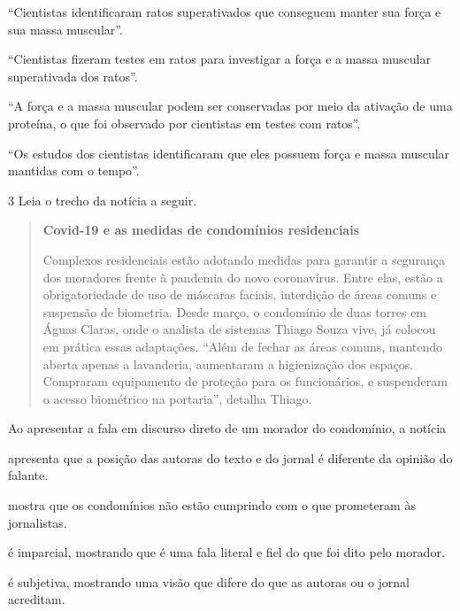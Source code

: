 \begin{escolha}
\item ``Cientistas identificaram ratos superativados que conseguem manter
sua força e sua massa muscular''.

\item ``Cientistas fizeram testes em ratos para investigar a força e a
massa muscular superativada dos ratos''.

\item ``A força e a massa muscular podem ser conservadas por meio da
ativação de uma proteína, o que foi observado por cientistas em testes
com ratos''.

\item ``Os estudos dos cientistas identificaram que eles possuem força e
massa muscular mantidas com o tempo''.
\end{escolha}

\num{3} Leia o trecho da notícia a seguir.

\begin{quote}
\textbf{Covid-19 e as medidas de condomínios residenciais}


Complexos residenciais estão adotando medidas para garantir a segurança
dos moradores frente à pandemia do novo coronavírus. Entre elas, estão a
obrigatoriedade de uso de máscaras faciais, interdição de áreas comuns e
suspensão de biometria. Desde março, o condomínio de duas torres em
Águas Claras, onde o analista de sistemas Thiago Souza vive, já colocou
em prática essas adaptações. ``Além de fechar as áreas comuns, mantendo
aberta apenas a lavanderia, aumentaram a higienização dos espaços.
Compraram equipamento de proteção para os funcionários, e suspenderam o
acesso biométrico na portaria'', detalha Thiago.

\end{quote}

\pagebreak
Ao apresentar a fala em discurso direto de um morador do condomínio, a
notícia

\begin{escolha}
\item apresenta que a posição das autoras do texto e do jornal é diferente
da opinião do falante.

\item mostra que os condomínios não estão cumprindo com o que prometeram
às jornalistas.

\item é imparcial, mostrando que é uma fala literal e fiel do que foi dito
pelo morador.

\item é subjetiva, mostrando uma visão que difere do que as autoras ou o
jornal acreditam.
\end{escolha}

